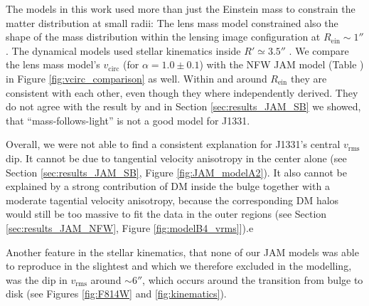 The models in this work used more than just the Einstein mass to constrain the matter distribution at small radii: The lens mass model constrained also the shape of the mass distribution within the lensing image configuration at $R_\text{ein} \sim 1''$. The dynamical models used stellar kinematics inside $R' \simeq 3.5''$ \Wilma{[TO DO: Check]}. We compare the lens mass model's $v_\text{circ}$ (for $\alpha=1.0\pm 0.1$) with the NFW JAM model (Table \Wilma{[TO DO]}) in Figure \ref{fig:vcirc_comparison} as well. Within and around $R_\text{ein}$ they are consistent with each other, even though they where independently derived. They do not agree with the result by \citet{SWELLSV} and in Section \ref{sec:results_JAM_SB} we showed, that ``mass-follows-light'' is not a good model for J1331.

Overall, we were not able to find a consistent explanation for J1331's central $v_\text{rms}$ dip. It cannot be due to tangential velocity anisotropy in the center alone (see Section \ref{sec:results_JAM_SB}, Figure \ref{fig:JAM_modelA2}). It also cannot be explained by a strong contribution of DM inside the bulge together with a moderate tagential velocity anisotropy, because the corresponding DM halos would still be too massive to fit the data in the outer regions (see Section \ref{sec:results_JAM_NFW}, Figure \ref{fig:modelB4_vrms}]).e

Another feature in the stellar kinematics, that none of our JAM models was able to reproduce in the slightest and which we therefore excluded in the modelling, was the dip in $v_\text{rms}$ around $\sim 6''$, which occurs around the transition from bulge to disk (see Figures \ref{fig:F814W} and \ref{fig:kinematics}).